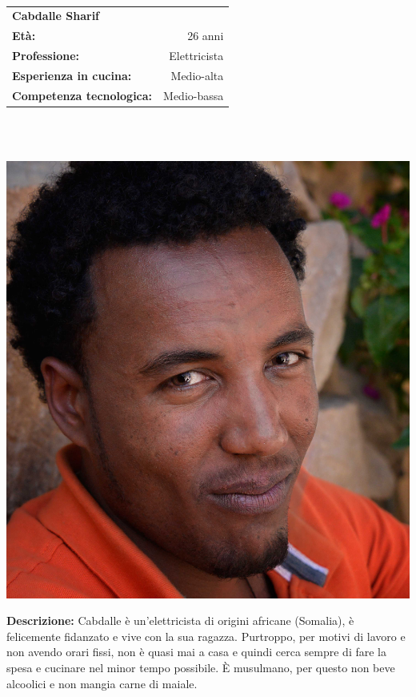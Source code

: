 \hrulefill\\
\begin{minipage}{.75\textwidth}
\begin{tabular}{l | r}
	\textbf{Cabdalle Sharif} & \\
	\textbf{Età:} & 26 anni\\
	\textbf{Professione:} & Elettricista\\
	\textbf{Esperienza in cucina:} & Medio-alta\\
	\textbf{Competenza tecnologica:} & Medio-bassa\\
\end{tabular}\\\\
\end{minipage}
\begin{minipage}{.24\textwidth}
	\includegraphics[width=\textwidth]{img/personas/cabdalle}
\end{minipage}
	\textbf{Descrizione:}
	Cabdalle è un'elettricista di origini africane (Somalia), è felicemente
	fidanzato e vive con la sua ragazza. Purtroppo, per motivi di lavoro e
	non avendo orari fissi, non è quasi mai a casa e quindi cerca sempre di
	fare la spesa e cucinare nel minor tempo possibile.  È musulmano, per
	questo non beve alcoolici e non mangia carne di maiale.

